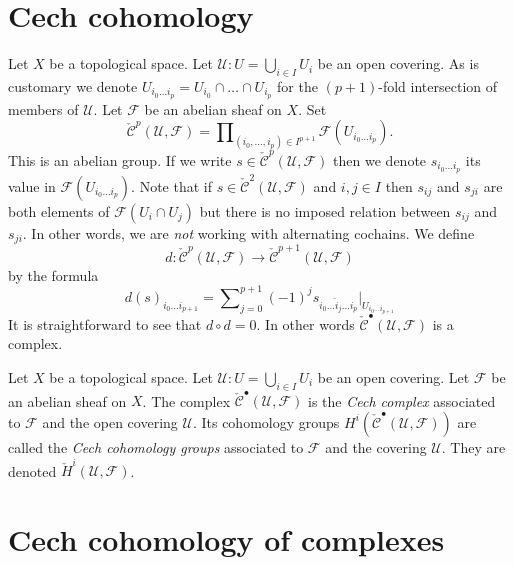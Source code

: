 \section{Cech cohomology}
\label{section-cech}

\noindent
Let $X$ be a topological space.
Let $\mathcal{U} : U = \bigcup_{i \in I} U_i$ be an open covering.
As is customary we denote
$U_{i_0\ldots i_p} = U_{i_0} \cap \ldots \cap U_{i_p}$ for the
$(p + 1)$-fold intersection of members of $\mathcal{U}$.
Let $\mathcal{F}$ be an abelian sheaf on $X$.
Set
$$
\check{\mathcal{C}}^p(\mathcal{U}, \mathcal{F})
=
\prod\nolimits_{(i_0, \ldots, i_p) \in I^{p + 1}}
\mathcal{F}(U_{i_0\ldots i_p}).
$$
This is an abelian group. If we write
$s \in \check{\mathcal{C}}^p(\mathcal{U}, \mathcal{F})$ then we denote
$s_{i_0\ldots i_p}$ its value in $\mathcal{F}(U_{i_0\ldots i_p})$.
Note that if $s \in \check{\mathcal{C}}^2(\mathcal{U}, \mathcal{F})$
and $i, j \in I$ then $s_{ij}$ and $s_{ji}$ are both elements
of $\mathcal{F}(U_i \cap U_j)$ but there is no imposed
relation between $s_{ij}$ and $s_{ji}$. In other words, we are {\it not}
working with alternating cochains. We define
$$
d : \check{\mathcal{C}}^p(\mathcal{U}, \mathcal{F})
\longrightarrow
\check{\mathcal{C}}^{p + 1}(\mathcal{U}, \mathcal{F})
$$
by the formula
$$
d(s)_{i_0\ldots i_{p + 1}}
=
\sum\nolimits_{j = 0}^{p + 1}
(-1)^j
s_{i_0\ldots \hat i_j \ldots i_p}|_{U_{i_0\ldots i_{p + 1}}}
$$
It is straightforward to see that $d \circ d = 0$. In other words
$\check{\mathcal{C}}^\bullet(\mathcal{U}, \mathcal{F})$ is a complex.

\begin{definition}
\label{definition-cech-complex}
Let $X$ be a topological space.
Let $\mathcal{U} : U = \bigcup_{i \in I} U_i$ be an open covering.
Let $\mathcal{F}$ be an abelian sheaf on $X$.
The complex $\check{\mathcal{C}}^\bullet(\mathcal{U}, \mathcal{F})$
is the {\it Cech complex} associated to $\mathcal{F}$ and the
open covering $\mathcal{U}$. Its cohomology groups
$H^i(\check{\mathcal{C}}^\bullet(\mathcal{U}, \mathcal{F}))$ are
called the {\it Cech cohomology groups} associated to
$\mathcal{F}$ and the covering $\mathcal{U}$.
They are denoted $\check H^i(\mathcal{U}, \mathcal{F})$.
\end{definition}






\section{Cech cohomology of complexes}
\label{section-cech-cohomology-of-complexes}

